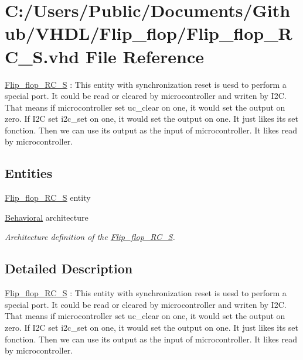 \hypertarget{_flip__flop___r_c___s_8vhd}{}\section{C\+:/\+Users/\+Public/\+Documents/\+Github/\+V\+H\+D\+L/\+Flip\+\_\+flop/\+Flip\+\_\+flop\+\_\+\+R\+C\+\_\+S.vhd File Reference}
\label{_flip__flop___r_c___s_8vhd}


\hyperlink{class_flip__flop___r_c___s}{Flip\+\_\+flop\+\_\+\+R\+C\+\_\+S} \+: This entity with synchronization reset is uesd to perform a special port. It could be read or cleared by microcontroller and writen by I2C. That means if microcontroller set \textquotesingle{}uc\+\_\+clear\textquotesingle{} on one, it would set the output on zero. If I2C set \textquotesingle{}i2c\+\_\+set\textquotesingle{} on one, it would set the output on one. It just likes its set fonction. Then we can use its output as the input of microcontroller. It likes read by microcontroller.  


\subsection*{Entities}
\begin{DoxyCompactItemize}
\item 
\hyperlink{class_flip__flop___r_c___s}{Flip\+\_\+flop\+\_\+\+R\+C\+\_\+S} entity
\item 
\hyperlink{class_flip__flop___r_c___s_1_1_behavioral}{Behavioral} architecture
\begin{DoxyCompactList}\small\item\em Architecture definition of the \hyperlink{class_flip__flop___r_c___s}{Flip\+\_\+flop\+\_\+\+R\+C\+\_\+S}. \end{DoxyCompactList}\end{DoxyCompactItemize}


\subsection{Detailed Description}
\hyperlink{class_flip__flop___r_c___s}{Flip\+\_\+flop\+\_\+\+R\+C\+\_\+S} \+: This entity with synchronization reset is uesd to perform a special port. It could be read or cleared by microcontroller and writen by I2C. That means if microcontroller set \textquotesingle{}uc\+\_\+clear\textquotesingle{} on one, it would set the output on zero. If I2C set \textquotesingle{}i2c\+\_\+set\textquotesingle{} on one, it would set the output on one. It just likes its set fonction. Then we can use its output as the input of microcontroller. It likes read by microcontroller. 

